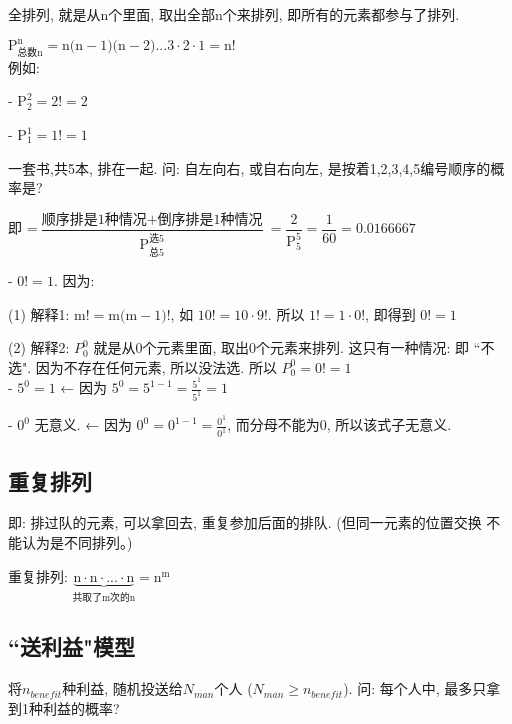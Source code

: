 \documentclass[UTF8]{ctexart}
\begin{document}
	全排列, 就是从n个里面, 取出全部n个来排列, 即所有的元素都参与了排列.
	
	$ \boxed{
	\text{P}_{\text{总数n}}^{\text{n}}=\text{n(n}-1\text{)(n}-2\text{)}...3\cdot 2\cdot 1=\text{n!}
	}
	$ \\
	
	例如:
	
	- $	\text{P}_{2}^{2}=2!=2	$
	
	- $ \text{P}_{1}^{1}=1!=1$ \\
	
		\begin{myEnvSample}
		一套书,共5本, 排在一起. 问: 自左向右, 或自右向左, 是按着1,2,3,4,5编号顺序的概率是?
		
		即 =$
		\dfrac{\text{顺序排是1种情况}+\text{倒序排是1种情况}}{\text{P}_{\text{总}5}^{\text{选}5}}=\dfrac{2}{\text{P}_{5}^{5}}=\dfrac{1}{60}=0.0166667
		$
	\end{myEnvSample} 


	
	- $0!=1$.  因为: 
	
	(1) 解释1: $\text{m!}=\text{m(m}-1\text{)!}$, 如 $10! =10 \cdot 9!$. 所以 $1! = 1 \cdot 0!$, 即得到 $0!=1$
	
	(2) 解释2: $P_{0}^{0}$ 就是从0个元素里面, 取出0个元素来排列. 这只有一种情况: 即 ``不选". 因为不存在任何元素, 所以没法选. 所以 $P_0^0=0!=1$ \\
	
	- $5^0 =1$ ← 因为 $5^0=5^{1-1}=\frac{5^1}{5^1}=1$
	
	- $0^0$ 无意义. ← 因为 $0^0=0^{1-1}=\frac{0^1}{0^1}$, 而分母不能为0, 所以该式子无意义.
	
	
	
	\subsection{重复排列}
	
	即: 排过队的元素, 可以拿回去, 重复参加后面的排队.  (但同一元素的位置交换 不能认为是不同排列。)
	
	重复排列: $\underset{\text{共取了m次的n}}{\underbrace{\text{n}\cdot \text{n}\cdot ...\cdot \text{n}}}=\text{n}^{\text{m}}	$ \\
	
		
	\subsection{``送利益"模型}
	
	将$n_{benefit}$种利益, 随机投送给$N_{man}$个人 ($N_{man}\ge n_{benefit}$). 问: 每个人中, 最多只拿到1种利益的概率?
	
\end{document}
